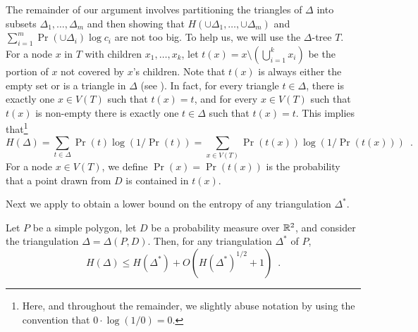 \documentclass[acmtalg]{acmsmall}
\begin{document}
The remainder of our argument involves partitioning the triangles of
$\Delta$ into subsets $\Delta_1,\ldots,\Delta_m$ and then showing that
$H(\cup\Delta_1,\ldots,\cup\Delta_m)$ and $\sum_{i=1}^m \Pr(\cup\Delta_i)\log
c_i$ are not too big.  To help us, we will use the $\Delta$-tree $T$.
For a node $x$ in $T$ with children $x_1,\ldots,x_k$, let $t(x) = x
\setminus (\bigcup_{i=1}^k x_i)$ be the portion of $x$ not covered by
$x$'s children.  Note that $t(x)$ is always either the empty set or is
a triangle in $\Delta$ (see ).  In fact, for every
triangle $t\in\Delta$, there is exactly one $x\in V(T)$ such that
$t(x)=t$, and for every $x\in V(T)$ such that $t(x)$ is non-empty
there is exactly one $t\in\Delta$ such that $t(x)=t$.  This implies
that\footnote{Here, and throughout the remainder, we slightly abuse
notation by using the convention that $0\cdot\log(1/0)=0$.}
\[
    H(\Delta) = \sum_{t\in\Delta}\Pr(t)\log(1/\Pr(t)) =
       \sum_{x\in V(T)}\Pr(t(x))\log(1/\Pr(t(x))) \enspace .
\]
For a node $x\in V(T)$, we define $\Pr(x)=\Pr(t(x))$ is the
probability that a point drawn from $D$ is contained in $t(x)$.

Next we apply  to obtain a lower bound on the
entropy of any triangulation $\Delta^*$. 

\begin{lem}
Let $P$ be a simple polygon, let $D$ be a probability measure over
$\mathbb{R}^2$, and consider the triangulation $\Delta=\Delta(P,D)$.
Then, for any triangulation $\Delta^*$ of $P$,
\[
    H(\Delta) \le H(\Delta^*) + O(H(\Delta^*)^{1/2}+1) \enspace .
\]
\end{lem}
\end{document}
